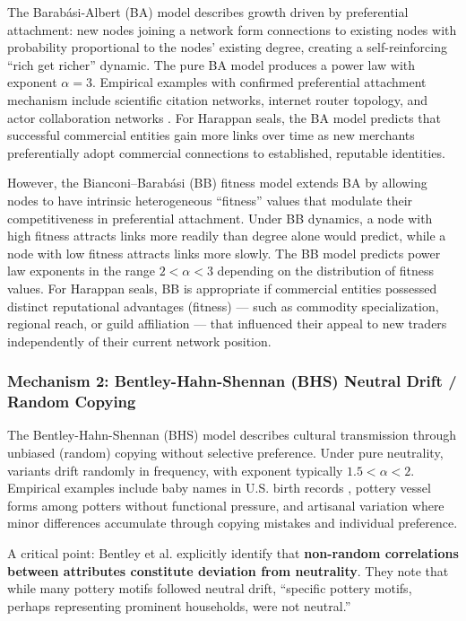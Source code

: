 \documentclass[12pt]{article}
\begin{document}
The Barab{\'a}si-Albert (BA) model \citep{barabasi1999emergence} describes growth
driven by preferential attachment: new nodes joining a network form connections
to existing nodes with probability proportional to the nodes' existing degree,
creating a self-reinforcing ``rich get richer'' dynamic. The pure BA model
produces a power law with exponent $\alpha = 3$. Empirical examples with confirmed
preferential attachment mechanism include scientific citation networks, internet
router topology, and actor collaboration networks \citep{jeong2003measuring}.
For Harappan seals, the BA model predicts that successful commercial entities
gain more links over time as new merchants preferentially adopt commercial
connections to established, reputable identities.

However, the Bianconi--Barab{\'a}si (BB) fitness model \citep{bianconi2001competition}
extends BA by allowing nodes to have intrinsic heterogeneous ``fitness'' values
that modulate their competitiveness in preferential attachment. Under BB dynamics,
a node with high fitness attracts links more readily than degree alone would predict,
while a node with low fitness attracts links more slowly. The BB model predicts
power law exponents in the range $2 < \alpha < 3$ depending on the distribution
of fitness values. For Harappan seals, BB is appropriate if commercial entities
possessed distinct reputational advantages (fitness) --- such as commodity
specialization, regional reach, or guild affiliation --- that influenced their
appeal to new traders independently of their current network position.

\subsubsection{Mechanism 2: Bentley-Hahn-Shennan (BHS) Neutral Drift / Random Copying}

The Bentley-Hahn-Shennan (BHS) model \citep{bentley2004random} describes cultural
transmission through unbiased (random) copying without selective preference. Under
pure neutrality, variants drift randomly in frequency, with exponent typically
$1.5 < \alpha < 2$. Empirical examples include baby names in U.S.
birth records \citep{bentley2004random}, pottery vessel forms among potters
without functional pressure, and artisanal variation where minor differences
accumulate through copying mistakes and individual preference.

A critical point: Bentley et al. explicitly identify that \textbf{non-random
correlations between attributes constitute deviation from neutrality}. They note
that while many pottery motifs followed neutral drift, ``specific pottery motifs,
perhaps representing prominent households, were not neutral.''
\end{document}
